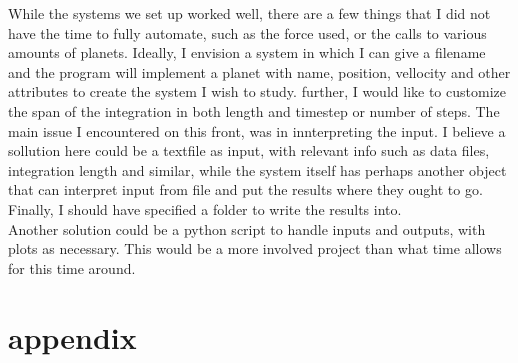 \documentclass[10pt, twocolumn]{revtex4-1}
\begin{document}
While the systems we set up worked well, there are a few things that I did not have the time to fully automate, such as the force used, or the calls to various 
amounts of planets. Ideally, I envision a system in which I can give a filename and the program will implement a planet with name, position, vellocity and 
other attributes to create the system I wish to study. further, I would like to customize the span of the integration in both length and timestep or number of
steps. The main issue I encountered on this front, was in innterpreting the input. I believe a sollution here could be a textfile as input, with relevant info
such as data files, integration length and similar, while the system itself has perhaps another object that can interpret input from file and put the results
where they ought to go. Finally, I should have specified a folder to write the results into. \\
Another solution could be a python script to handle inputs and outputs, with plots as necessary. This would be a more involved project than what time allows 
for this time around. 

\section{appendix}


\end{document}
